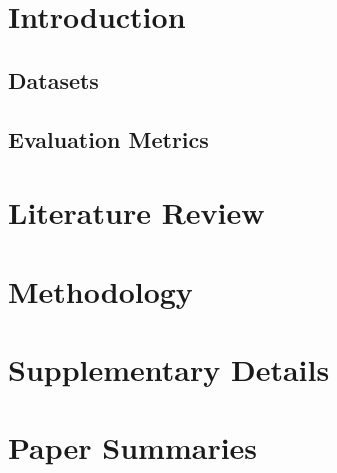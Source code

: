 \documentclass[]{book}
\begin{document}


\tableofcontents


\chapter{Introduction}






\section{Datasets}

\section{Evaluation Metrics}

\chapter{Literature Review}

\chapter{Methodology}




\appendix

\chapter{Supplementary Details}


\chapter{Paper Summaries}

\newpage

\newpage

\newpage

\newpage

\newpage

\newpage



\newpage
\thispagestyle{empty}
\listoffigures
\newpage
\listoftables


\newpage


\end{document}
